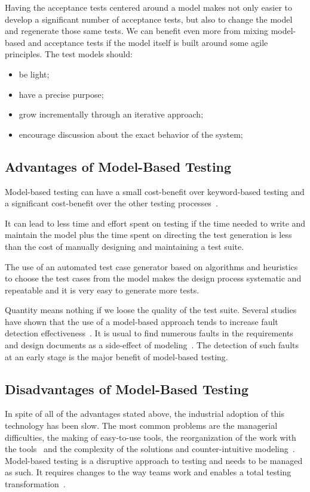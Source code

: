 \noindent Having the acceptance tests centered around a model makes not only
easier to develop a significant number of acceptance tests, but also to change
the model and regenerate those same tests. We can benefit even more from mixing
model-based and acceptance tests if the model itself is built around some agile
principles. The test models should:
\begin{itemize}
\item be light; 
\item have a precise purpose;
\item grow incrementally through an iterative approach;
\item encourage discussion about the exact behavior of the system;
\end{itemize}

\subsection{Advantages of Model-Based Testing}
Model-based testing can have a small cost-benefit over keyword-based testing and a significant cost-benefit over the other testing processes~\cite{1200168}.

It can lead to less time and effort spent on testing if the time needed to write and maintain the model plus the time spent on directing the test generation is less than the cost of manually designing and maintaining a test suite. 

The use of an automated test case generator based on algorithms and heuristics to choose the test cases from the model makes the design process systematic and repeatable and it is very easy to generate more tests.

Quantity means nothing if we loose the quality of the test
suite. Several studies have shown that the use of a
model-based approach tends to increase fault detection effectiveness~\cite{Dalal1999,Farchi2002}. It is usual to find numerous faults in the requirements and design documents as a side-effect of modeling~\cite{1200168}. The detection of such faults at an early stage is the major benefit of model-based testing.

\subsection{Disadvantages of Model-Based Testing}

In spite of all of the advantages stated above, the industrial adoption of this technology has been slow. The most common problems are the managerial difficulties, the making of easy-to-use tools, the reorganization of the work with the tools~\cite{Robinson2013} and the complexity of the solutions and counter-intuitive modeling~\cite{Jääskeläinen2008}. Model-based testing is a disruptive approach to testing and needs to be managed as such. It requires changes to the way teams work and enables a total testing transformation~\cite{Jorgensen2017}.

